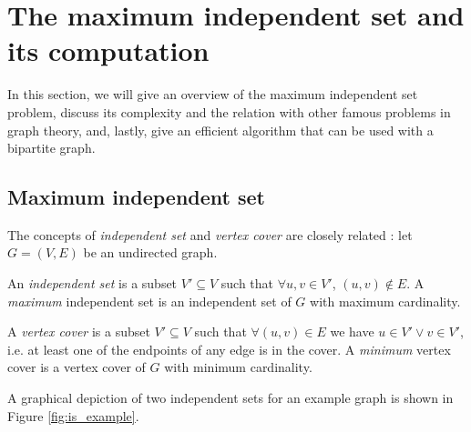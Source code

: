 \section{The maximum independent set and its computation} \label{sec:is_comp}

In this section, we will give an overview of the maximum independent set problem, discuss its complexity and the relation with other famous problems in graph theory, and, lastly, give an efficient algorithm that can be used with a bipartite graph.

\subsection{Maximum independent set}

The concepts of \emph{independent set} and \emph{vertex cover} are closely related \cite{np_book}: let $G=(V,E)$ be an undirected graph.

\begin{definition}
	An \emph{independent set} is a subset $V' \subseteq V$ such that $ \forall u,v \in V'$, $(u,v) \notin E$.
	A \emph{maximum} independent set is an independent set of $G$ with maximum cardinality.
\end{definition}

\begin{definition}
	A \emph{vertex cover} is a subset $V' \subseteq V$ such that $\forall (u,v) \in E$ we have $u \in V' \vee v \in V'$, i.e. at least one of the endpoints of any edge is in the cover. A \emph{minimum} vertex cover is a vertex cover of $G$ with minimum cardinality.
\end{definition}

A graphical depiction of two independent sets for an example graph is shown in Figure \ref{fig:is_example}.

